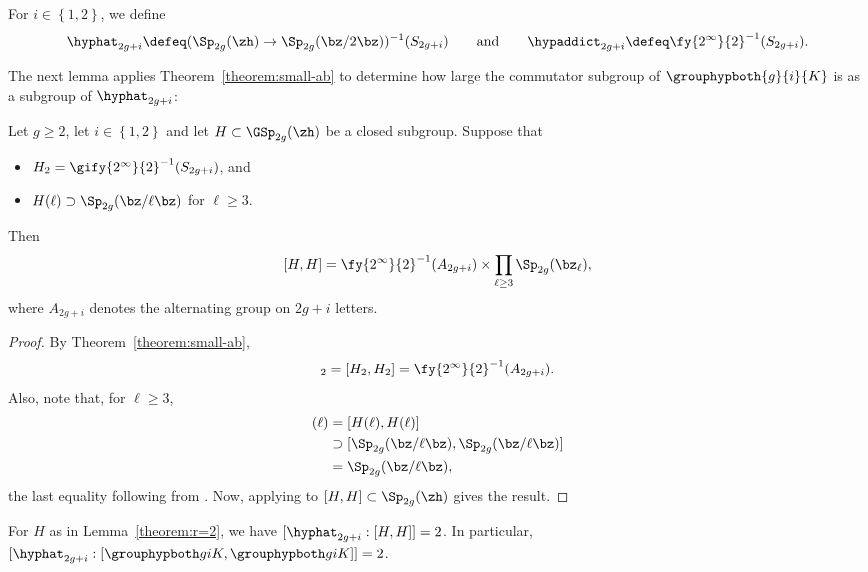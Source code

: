 \begin{definition}\label{grpnotes}
	For $i \in \left\{ 1,2 \right\}$,
	we define 
\begin{equation*}
 \hyphat_{2g+i} \defeq (\Sp_{2g}(\zh) \to \Sp_{2g}(\bz / 2 \bz))^{-1}(S_{2g+i}) \qquad \text{and} \qquad \hypaddict_{2g+i} \defeq \fy{2^\infty}{2}^{-1}(S_{2g+i}).
\end{equation*}
\end{definition}
The next lemma applies Theorem~\ref{theorem:small-ab} to determine how large the commutator subgroup of $\grouphypboth{g}{i}{K}$ is as a subgroup of $\hyphat_{2g+i}$:
\begin{lemma} \label{theorem:r=2}
	Let $g \ge 2$, let $i \in \left\{ 1,2 \right\}$
	and let $H \subset \GSp_{2g}(\zh)$ be a closed subgroup. Suppose that 
\begin{itemize} 
\item $H_2 = \gify{2^\infty}{2}^{-1}(S_{2g+i})$, and 
\item $H(\ell) \supset \Sp_{2g}(\bz / \ell \bz)$ for $\ell \ge 3$.
\end{itemize} 
Then 
\[
[H, H] = \fy{2^\infty}{2}^{-1}(A_{2g+i}) \times \prod_{\ell \ge 3} \Sp_{2g}(\bz_\ell),
\]
where $A_{2g+i}$ denotes the alternating group on $2g + i$ letters.
\end{lemma} 
\begin{proof} 
By Theorem~\ref{theorem:small-ab}, 
\begin{align*} 
[H, H]_2 = [H_2, H_2] = \fy{2^\infty}{2}^{-1}(A_{2g+i}). 
\end{align*} 
Also, note that, for $\ell \ge 3$, 
\begin{align*}
[H, H](\ell) &= [H(\ell), H(\ell)] \\
&\supset [\Sp_{2g}(\bz / \ell \bz), \Sp_{2g} (\bz / \ell \bz)] \\
&= \Sp_{2g}(\bz / \ell \bz), 
\end{align*} 
the last equality following from \cite[3.3.6]{omeara1978symplectic}. Now, applying \cite[Proposition 2.5]{landesman-swaminathan-tao-xu:rational-families} to $[H, H] \subset \Sp_{2g}(\zh)$ gives the result. 
\end{proof} 
\begin{corollary} \label{theorem:r=2:special}
For $H$ as in Lemma~\ref{theorem:r=2}, we have $[\hyphat_{2g+i} : [H, H]] = 2$. In particular, $[\hyphat_{2g+i} : [\grouphypboth g i K, \grouphypboth g i K]] = 2$. 
\end{corollary} 

